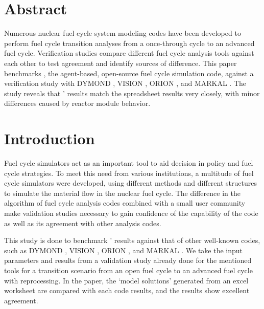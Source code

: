 \section{Abstract}
Numerous nuclear fuel cycle system modeling codes
have been developed to perform fuel cycle transition
analyses from a once-through cycle to an advanced
fuel cycle. Verification studies compare different
fuel cycle analysis tools against each other to
test agreement and identify sources of difference.
This paper benchmarks \Cyclus, the agent-based,
open-source fuel cycle simulation code, against
a verification study \cite{feng_standardized_2016} with
DYMOND \cite{yacout_modeling_2005},
VISION \cite{jacobson_verifiable_2010},
ORION \cite{gregg_analysis_2012}, and
MARKAL \cite{shay_epa_2006}. The study reveals
that \Cyclus' results match the spreadsheet results
very closely, with minor differences caused by
reactor module behavior.

\section{Introduction}
Fuel cycle simulators act as an important tool to
aid decision in policy and fuel cycle strategies.
To meet this need from various institutions, a
multitude of fuel cycle simulators were developed,
using different methods and different structures
to simulate the material flow in the nuclear fuel cycle.
The difference in the algorithm of fuel cycle analysis
codes combined with a small user community make
validation studies necessary to gain
confidence of the capability of the code as well as its
agreement with other analysis codes.

This study is done to benchmark \Cyclus' results
against that of other well-known codes, such as
DYMOND \cite{yacout_modeling_2005},
VISION \cite{jacobson_verifiable_2010},
ORION \cite{gregg_analysis_2012}, and
MARKAL \cite{shay_epa_2006}. We take the input
parameters and results from a validation study
\cite{feng_standardized_2016} already done for the
mentioned tools for a transition scenario from an
open fuel cycle to an advanced fuel cycle with
reprocessing. In the paper, the `model solutions'
generated from an excel worksheet are compared
with each code results, and the results show
excellent agreement.


\subsection{\Cyclus}

